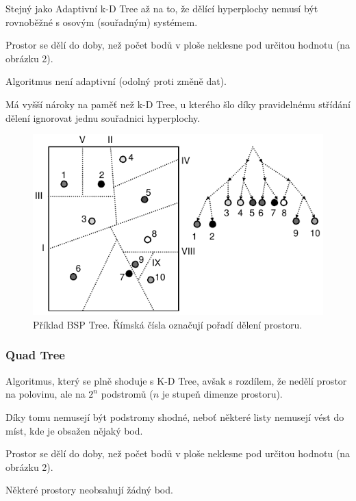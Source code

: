 \begin{compactitem}
    \item Stejný jako Adaptivní k-D Tree až na to, že dělící hyperplochy nemusí být rovnoběžné s osovým (souřadným) systémem.
    \item Prostor se dělí do doby, než počet bodů v ploše neklesne pod určitou hodnotu (na obrázku 2).
    \item Algoritmus není adaptivní (odolný proti změně dat).
    \item Má vyšší nároky na paměť než k-D Tree, u kterého šlo díky pravidelnému střídání dělení ignorovat jednu souřadnici hyperplochy.
\end{compactitem}

\begin{figure}[H]
    \centering
    \includegraphics[width=0.75\linewidth]{bsp_tree.pdf}
    \caption{Příklad BSP Tree. Římská čísla označují pořadí dělení prostoru.}
\end{figure}

\subsubsection{Quad Tree}

\begin{compactitem}
    \item Algoritmus, který se plně shoduje s K-D Tree, avšak s rozdílem, že nedělí prostor na polovinu, ale na $2^n$ podstromů ($n$ je stupeň dimenze prostoru). \begin{compactitem}
        \item Díky tomu nemusejí být podstromy shodné, neboť některé listy nemusejí vést do míst, kde je obsažen nějaký bod.
    \end{compactitem}
    \item Prostor se dělí do doby, než počet bodů v ploše neklesne pod určitou hodnotu (na obrázku 2).
    \item Některé prostory neobsahují žádný bod.
\end{compactitem}

